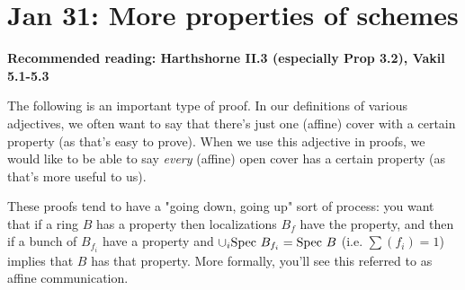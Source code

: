 \documentclass[10pt,reqno]{amsart}
\theoremstyle{definition}
\theoremstyle{remark}
\numberwithin{equation}{section}
\numberwithin{theorem}{section}
\newcommand{\spec}{\textup{Spec }}
\begin{document}
\section{Jan 31: More properties of schemes}
\textbf{Recommended reading: Harthshorne II.3 (especially Prop 3.2), Vakil 5.1-5.3}

The following is an important type of proof. In our definitions of various adjectives, we often want to say that there's just one (affine) cover with a certain property (as that's easy to prove). When we use this adjective in proofs, we would like to be able to say \textit{every} (affine) open cover has a certain property (as that's more useful to us).

These proofs tend to have a "going down, going up" sort of process: you want that if a ring $B$ has a property then localizations $B_f$ have the property, and then if a bunch of $B_{f_i}$ have a property and $\cup_i \spec B_{f_i} = \spec B$ (i.e. $\sum (f_i) = 1$) implies that $B$ has that property. More formally, you'll see this referred to as affine communication.
\end{document}
